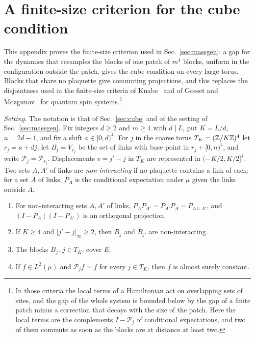 \section{A finite-size criterion for the cube condition}\label{app:finite}

This appendix proves the finite-size criterion used in
Sec.~\ref{sec:massgen}: a gap for the dynamics that resamples the blocks of
one patch of $m^4$ blocks, uniform in the configuration outside the patch,
gives the cube condition on every large torus. Blocks that share no
plaquette give commuting projections, and this replaces the disjointness
used in the finite-size criteria of Knabe~\cite{Kna88} and of Gosset and
Mozgunov~\cite{GM16} for quantum spin systems.\footnote{In those criteria
the local terms of a Hamiltonian act on overlapping sets of sites, and the
gap of the whole system is bounded below by the gap of a finite patch minus
a correction that decays with the size of the patch. Here the local terms
are the complements $I-\mathcal P_j$ of conditional expectations, and two
of them commute as soon as the blocks are at distance at least two.}

\enlargethispage{5pt}
\emph{Setting.} The notation is that of Sec.~\ref{sec:cube} and of the
setting of Sec.~\ref{sec:massgen}. Fix integers $d\ge2$ and $m\ge4$ with
$d\mid L$, put $K=L/d$, $n=2d-1$, and fix a shift $a\in[0,d)^4$. For $j$ in
the coarse torus $T_K=(\mathbb{Z}/K\mathbb{Z})^4$ let $r_j=a+dj$, let $B_j=V_{r_j}$ be the
set of links with base point in $r_j+[0,n)^4$, and write $\mathcal P_j=
\mathcal P_{r_j}$. Displacements $v=j'-j$ in $T_K$ are represented in
$(-K/2,K/2]^4$. Two sets $A,A'$ of links are \emph{non-interacting} if no
plaquette contains a link of each; for a set $A$ of links, $P_A$ is the
conditional expectation under $\mu$ given the links outside $A$.

\begin{lemma}\label{lem:fcommute}
\begin{enumerate}[label=\textup{(\roman*)},leftmargin=*]
\item For non-interacting sets $A,A'$ of links, $P_AP_{A'}=P_{A'}P_A=
P_{A\cup A'}$, and $(I-P_A)(I-P_{A'})$ is an orthogonal projection.
\item If $K\ge4$ and $|j'-j|_\infty\ge2$, then $B_j$ and $B_{j'}$ are
non-interacting.
\item The blocks $B_j$, $j\in T_K$, cover $E$.
\item If $f\in L^2(\mu)$ and $\mathcal P_jf=f$ for every $j\in T_K$, then
$f$ is almost surely constant.
\end{enumerate}
\end{lemma}

